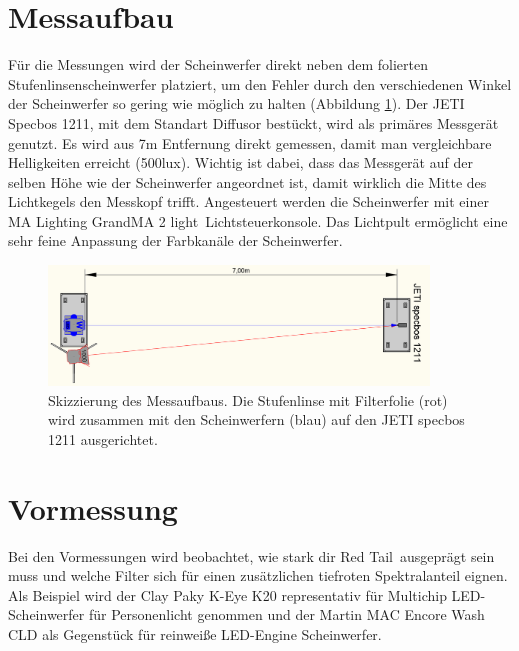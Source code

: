 \section{Messaufbau}
\label{sec_vmaum}

Für die Messungen wird der Scheinwerfer direkt neben dem folierten Stufenlinsenscheinwerfer platziert, um den Fehler durch den verschiedenen Winkel der Scheinwerfer so gering wie möglich zu halten (Abbildung \ref{b_aufbaumessung1}). Der JETI Specbos 1211, mit dem Standart Diffusor bestückt, wird als primäres Messgerät genutzt. Es wird aus 7m Entfernung direkt gemessen, damit man vergleichbare Helligkeiten erreicht (500lux). Wichtig ist dabei, dass das Messgerät auf der selben Höhe wie der Scheinwerfer angeordnet ist, damit wirklich die Mitte des Lichtkegels den Messkopf trifft.
Angesteuert werden die Scheinwerfer mit einer MA Lighting \glqq GrandMA 2 light\grqq\ Lichtsteuerkonsole. Das Lichtpult ermöglicht eine sehr feine Anpassung der Farbkanäle der Scheinwerfer.


\begin{figure}[H]     %
\centering
\includegraphics[width=0.9\textwidth]{bilder/aufbaumessung1} 
\caption {Skizzierung des Messaufbaus. Die Stufenlinse mit Filterfolie (rot) wird zusammen mit den Scheinwerfern (blau) auf den JETI specbos 1211 ausgerichtet.}\label{b_aufbaumessung1}
\end{figure}


\section{Vormessung}\label{sec_vmsung}
Bei den Vormessungen wird beobachtet, wie stark dir \glqq Red Tail\grqq\ ausgeprägt sein muss und welche Filter sich für einen zusätzlichen tiefroten Spektralanteil eignen.   
Als Beispiel wird der Clay Paky K-Eye K20 representativ für Multichip LED-Scheinwerfer für Personenlicht genommen und der Martin MAC Encore Wash CLD als Gegenstück für reinweiße LED-Engine Scheinwerfer. 

